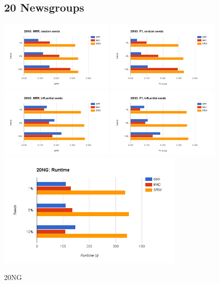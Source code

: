 \documentclass[12pt]{article}
\begin{document}
\begin{figure}[p]
    \subsection{20 Newsgroups}
    \centering
    \includegraphics[width=0.49\textwidth]{figures/20ng-mrr-random}
    \includegraphics[width=0.49\textwidth]{figures/20ng-f1-random}
    \includegraphics[width=0.49\textwidth]{figures/20ng-mrr-top}
    \includegraphics[width=0.49\textwidth]{figures/20ng-f1-top}
    \includegraphics[width=0.8\textwidth]{figures/20ng-runtime}
    \caption{20NG}
\end{figure}
\end{document}
